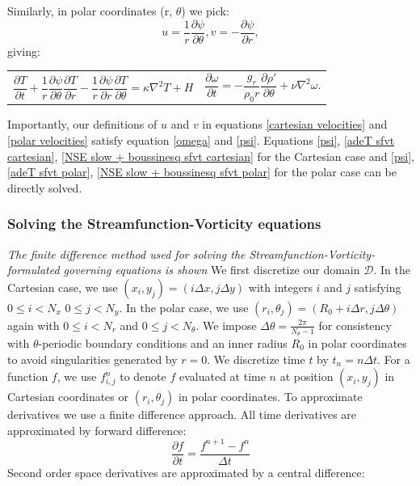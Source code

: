 \documentclass{article}
\begin{document}
Similarly, in polar coordinates (r, $\theta$) we pick:
\begin{equation}
	u = \frac{1}{r} \frac{\partial \psi}{\partial \theta}, v = -\frac{\partial \psi}{\partial r},
	\label{polar velocities}
\end{equation}
giving:

\begin{tabularx}{\textwidth}{XX}
\begin{equation}
	\frac{\partial T}{\partial t} + \frac{1}{r} \frac{\partial \psi}{\partial \theta} \frac{\partial T}{\partial r} - \frac{1}{r} \frac{\partial \psi}{\partial r} \frac{\partial T}{\partial \theta} = \kappa \nabla^2 T + H
	\label{adeT sfvt polar}
\end{equation}
    &
\begin{equation}
	\frac{\partial \omega}{\partial t} = - \frac{g_r}{\rho_0 r} \frac{\partial \rho'}{\partial \theta} +\nu \nabla^2 \omega.
	\label{NSE slow + boussinesq sfvt polar}
\end{equation}
\end{tabularx}\par
Importantly, our definitions of $u$ and $v$ in equations \ref{cartesian velocities} and \ref{polar velocities} satisfy equation \ref{omega} and \ref{psi}. Equations \ref{psi}, \ref{adeT sfvt cartesian}, \ref{NSE slow + boussinesq sfvt cartesian} for the Cartesian case and \ref{psi}, \ref{adeT sfvt polar}, \ref{NSE slow + boussinesq sfvt polar} for the polar case can be directly solved.

\subsubsection*{Solving the Streamfunction-Vorticity equations}
{\it{The finite difference method used for solving the Streamfunction-Vorticity-formulated governing equations is shown}}
\vspace{0.3cm}
\newline
\noindent We first discretize our domain $\mathcal{D}$. In the Cartesian case, we use $(x_i,y_j)=(i \Delta x, j \Delta y)
$ with integers $i$ and $j$ satisfying $0\leq i < N_x$ $0 \leq j < N_y$. In the polar case, we use $(r_i, \theta_j)= (R_0 
+ i \Delta r, j 
\Delta \theta)$ again with  $0 \leq i < N_r$ and $0 \leq j < N_{\theta}$. We impose $\Delta \theta = \frac{2 \pi}
{N_{\theta} - 1}$ for consistency with $\theta$-periodic boundary conditions and an inner radius $R_0$ in polar 
coordinates to avoid 
singularities generated by $r=0$. We discretize time $t$ by $t_n = n \Delta t$. For a function $f$, we use 
$f^n_{i,j}$ to denote $f$ evaluated at time $n$ at position $(x_i,y_j)$ in Cartesian coordinates or $(r_i, \theta_j)$ in 
polar coordinates. 
\newline
To approximate derivatives we use a finite difference approach. All time derivatives are approximated by forward difference:
\begin{equation}
	\frac{\partial f}{\partial t} = \frac{f^{n+1} - f^{n}}{\Delta t}
	\label{forward time difference}
\end{equation}
Second order space derivatives are approximated by a central difference:
\end{document}
